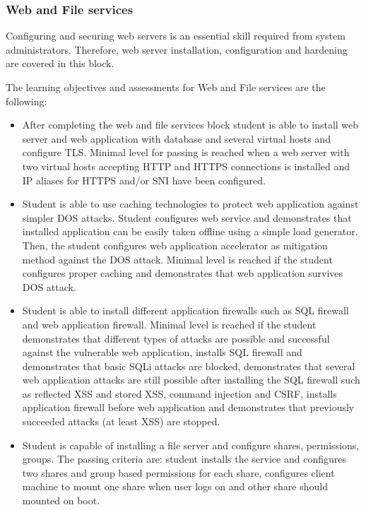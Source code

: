 \subsubsection{Web and File services}
Configuring and securing web servers is an essential skill required from system administrators. Therefore, web server installation, configuration and hardening are covered in this block.

The learning objectives and assessments for Web and File services are the following:
\begin{itemize}
\item After completing the web and file services block student is able to install web server and web application with database and several virtual hosts and configure \gls{TLS}. Minimal level for passing is reached when a web server with two virtual hosts accepting \gls{HTTP} and \gls{HTTPS} connections is installed and IP aliases for  \gls{HTTPS} and/or \gls{SNI} have been configured.
\item Student is able to use caching technologies to protect web application against simpler \gls{DOS} attacks. Student configures web service and demonstrates that installed application can be easily taken offline using a simple load generator. Then, the student configures web application accelerator as mitigation method against the  \gls{DOS} attack.  Minimal level is reached if the student configures proper caching and demonstrates that web application survives \gls{DOS} attack.
\item Student is able to install different application firewalls such as \gls{SQL} firewall and web application firewall. Minimal level is reached if the student demonstrates that different types of attacks are possible and successful against the vulnerable web application, installs \gls{SQL} firewall and demonstrates that basic \gls{SQLi} attacks are blocked, demonstrates that several web application attacks are still possible after installing the \gls{SQL} firewall such as reflected \gls{XSS} and stored \gls{XSS}, command injection and \gls{CSRF}, installs application firewall before web application and demonstrates that previously succeeded attacks (at least \gls{XSS}) are stopped.
\item Student is capable of installing a file server and configure shares, permissions, groups. The passing criteria are: student installs the service and configures two shares and group based permissions for each share, configures client machine to mount one share when user logs on and other share should mounted on boot.\end{itemize}


